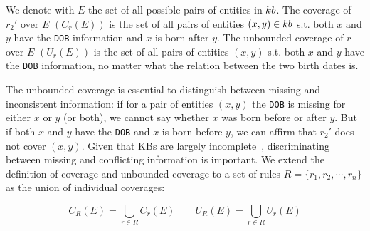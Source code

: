 \begin{example}
	We denote with $E$ the set of all possible pairs of entities in ${\sc kb}$. The coverage of $r_2'$ over $E$ $(C_r(E))$ is the set of all pairs of entities $(x,y) \in {\sc kb}$ s.t. both $x$ and $y$ have the \texttt{DOB} information and $x$ is born after $y$. The unbounded coverage of $r$ over $E$ $(U_r(E))$ is the set of all pairs of entities $(x,y)$ s.t. both $x$ and $y$ have the \texttt{DOB} information, no matter what the relation between the two birth dates is. 
\end{example} 

The unbounded coverage is essential to distinguish between missing and inconsistent information: if for a pair of entities $(x,y)$ the \texttt{DOB} is missing for either $x$ or $y$ (or both), we cannot say whether $x$ was born before or after $y$. 
But if both $x$ and $y$ have the \texttt{DOB} and $x$ is born before $y$, we can affirm that $r_2'$ does not cover $(x,y)$. Given that KBs are largely incomplete~\cite{min2013distant}, discriminating between missing and conflicting information is %
 important.
%
We extend the definition of coverage and unbounded coverage to a set of rules $R=\{r_1,r_2,\cdots,r_n\}$ as the union of individual coverages:

\vspace{-3mm}	
\begin{equation*}
	C_R(E) = \bigcup \limits_{r \in R} C_r(E) \qquad U_R(E) = \bigcup \limits_{r \in R} U_r(E) 	\end{equation*}
\vspace{-3mm}



